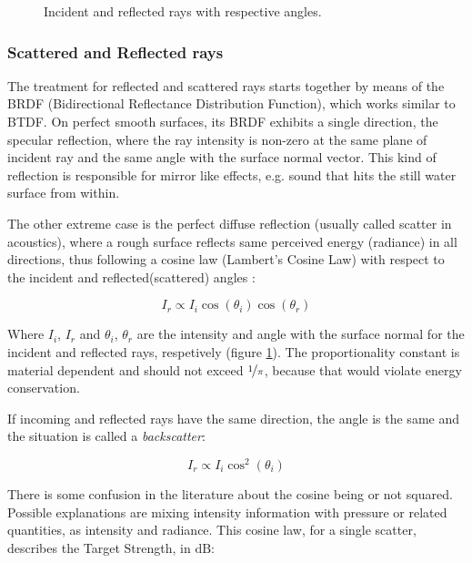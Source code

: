 \begin{figure}[h]
	\centering
	
	\caption{Incident and reflected rays with respective angles.}
	\label{fig:ray_reflect}
\end{figure}


\subsubsection{Scattered and Reflected rays}
The treatment for reflected and scattered rays starts together by means of the
BRDF (Bidirectional Reflectance Distribution
Function)\cite{blake1995remote,miller2015real,durany2015analytical}, which works
similar to BTDF. On perfect smooth surfaces, its BRDF exhibits a single
direction, the specular reflection, where the ray intensity is non-zero at the
same plane of incident ray and the same angle with the surface normal vector.
This kind of reflection is responsible for mirror like effects, e.g. sound that hits
the still water surface from within\cite{LURTON,Etter2013}.

The other extreme case is the perfect diffuse reflection (usually called scatter
in acoustics), where a rough surface reflects same perceived energy (radiance)
in all directions, thus following a cosine law (Lambert's Cosine Law) with
respect to the incident and reflected(scattered) angles
\cite{united1977geometrical,cox2004acoustic}:

\begin{equation}
\label{eq:lambert}
I_r \propto	 I_i \cos(\theta_i) \cos(\theta_r)
\end{equation}

Where $I_i$,  $I_r$ and $\theta_i$, $\theta_r$ are the intensity and angle with
the surface normal for the incident and reflected rays,
respetively (figure \ref{fig:ray_reflect}). The proportionality constant is
material dependent and should not exceed $\nicefrac{1}{\pi}$, because that would violate
energy conservation.

If incoming and reflected rays have the same direction, the angle is the same
and the situation is called a \textit{backscatter}:

\begin{equation*}
I_r \propto I_i \cos^2(\theta_i)
\end{equation*}

There is some confusion in the literature about the cosine being or not
squared\cite{durany2015analytical,cox2006tutorial,cox2004acoustic,jones2009modelling,LURTON,Etter2013}.
Possible explanations are mixing intensity information with pressure
or related quantities, as intensity and radiance. This cosine law, for a single
scatter, describes the Target Strength, in $\text{dB}$:

